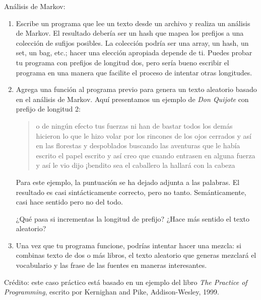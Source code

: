 \begin{exercise}

Análisis de Markov:
\label{markov_analysis}

\begin{enumerate}

\item Escribe un programa que lee un texto desde un archivo y realiza
un análisis de Markov. El resultado debería ser un hash que mapea los
prefijos a una colección de sufijos posibles. La colección podría ser
una array, un hash, un set, un bag, etc.; hacer una elección apropiada
depende de ti. Puedes probar tu programa con prefijos de longitud dos, pero
sería bueno escribir el programa en una manera que facilite el proceso
de intentar otras longitudes.

\item Agrega una función al programa previo para genera un texto aleatorio
basado en el análisis de Markov. Aquí presentamos un ejemplo de {\em Don Quijote}
con prefijo de longitud 2:

\begin{quote}
o de ningún efecto tus fuerzas ni han de bastar todos los demás 
hicieron lo que le hizo volar por los rincones de los ojos cerrados
y así en las florestas y despoblados buscando las aventuras que le había
escrito el papel escrito y así creo que cuando entrasen en alguna fuerza
y así le vio dijo ¡bendito sea el caballero la hallará con la cabeza
\end{quote}

Para este ejemplo, la puntuación se ha dejado adjunta a las palabras.
El resultado es casi sintácticamente correcto, pero no tanto.
Semánticamente, casi hace sentido pero no del todo.

¿Qué pasa si incrementas la longitud de prefijo? ¿Hace más sentido 
el texto aleatorio?

\item Una vez que tu programa funcione, podrías intentar hacer 
una mezcla: si combinas texto de dos o más libros, el texto 
aleatorio que generas mezclará el vocabulario y las frase
de las fuentes en maneras interesantes.

\end{enumerate}

Crédito: este caso práctico está basado en un ejemplo del libro 
{\em The Practice of Programming}, escrito por Kernighan and
Pike, Addison-Wesley, 1999.

\end{exercise}

